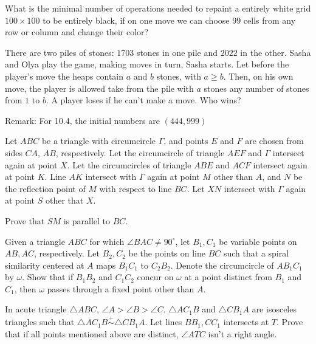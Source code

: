 \documentclass[11pt]{scrartcl}
\begin{document}
\begin{problem}[549441013338848]
	What is the minimal number of operations needed to repaint a entirely white grid $100 \times 100$ to be entirely black, if on one move we can choose $99$ cells from any row or column and change their color?
\end{problem}
\begin{problem}[15195306726194]
There are two piles of stones: $1703$ stones in one pile and $2022$ in the other. Sasha and Olya
play the game, making moves in turn, Sasha starts. Let before the player's move the heaps contain $a$ and $b$ stones, with $a \geq b$. Then, on his own move, the player is allowed take from the pile with $a$ stones any number of stones from $1$ to $b$. A player loses if he can't make a move. Who wins?

Remark: For 10.4, the initial numbers are $(444,999)$
\end{problem}
\begin{problem}[5897111412933990257]
Let $ABC$ be a triangle with circumcircle $\Gamma$, and points $E$ and $F$ are chosen from sides $CA$, $AB$, respectively. Let the circumcircle of triangle $AEF$ and $\Gamma$ intersect again at point $X$. Let the circumcircles of triangle $ABE$ and $ACF$ intersect again at point $K$. Line $AK$ intersect with $\Gamma$ again at point $M$ other than $A$, and $N$ be the reflection point of $M$ with respect to line $BC$. Let $XN$ intersect with $\Gamma$ again at point $S$ other that $X$.

Prove that $SM$ is parallel to $BC$.
\end{problem}
\begin{problem}[852531542088551]
	Given a triangle $ABC$ for which $\angle BAC \neq 90^{\circ}$, let $B_1, C_1$ be variable points on $AB,AC$, respectively. Let $B_2,C_2$ be the points on line $BC$ such that a spiral similarity centered at $A$ maps $B_1C_1$ to $C_2B_2$. Denote the circumcircle of $AB_1C_1$ by $\omega$. Show that if $B_1B_2$ and $C_1C_2$ concur on $\omega$ at a point distinct from $B_1$ and $C_1$, then $\omega$ passes through a fixed point other than $A$.
\end{problem}
\begin{problem}[8534263250311217423]
	In acute triangle $\triangle {ABC}$, $\angle 
A > \angle B > \angle C$. $\triangle {AC_1B}$ and $\triangle {CB_1A}$ are isosceles triangles such that $\triangle {AC_1B} \stackrel{+}{\sim}  \triangle {CB_1A}$. Let lines $BB_1, CC_1$ intersects at ${T}$. Prove that if all points mentioned above are distinct, $\angle ATC$ isn't a right angle.
\end{problem}
\end{document}
